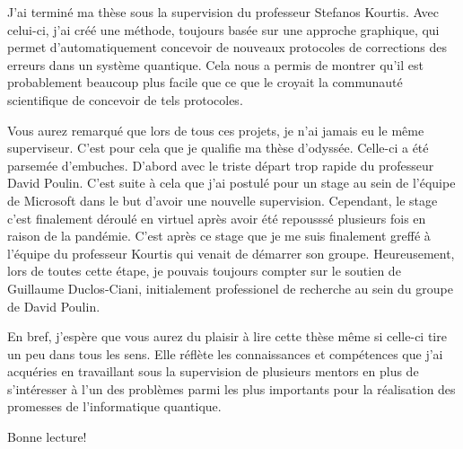 J'ai terminé ma thèse sous la supervision du professeur Stefanos Kourtis.
Avec celui-ci,
j'ai créé une méthode, toujours basée sur une approche graphique, 
qui permet d'automatiquement concevoir de nouveaux protocoles de 
corrections des erreurs dans un système quantique.
Cela nous a permis de montrer qu'il est probablement beaucoup plus facile 
que ce que le croyait la communauté scientifique de concevoir de tels protocoles.

Vous aurez remarqué que lors de tous ces projets,
je n'ai jamais eu le même superviseur.
C'est pour cela que je qualifie ma thèse d'odyssée.
Celle-ci a été parsemée d'embuches.
D'abord avec le triste départ trop rapide du professeur David Poulin.
C'est suite à cela que j'ai postulé pour un stage au sein de l'équipe de Microsoft
dans le but d'avoir une nouvelle supervision.
Cependant, le stage c'est finalement déroulé en virtuel après avoir été repousssé
plusieurs fois en raison de la pandémie.
C'est après ce stage que je me suis finalement greffé à l'équipe du professeur Kourtis 
qui venait de démarrer son groupe.
Heureusement,
lors de toutes cette étape, 
je pouvais toujours compter sur le soutien de Guillaume Duclos-Ciani,
initialement professionel de recherche au sein du groupe de David Poulin.

En bref,
j'espère que vous aurez du plaisir à lire cette thèse même si celle-ci 
tire un peu dans tous les sens.
Elle réflète les connaissances et compétences que j'ai acquéries en travaillant sous 
la supervision de plusieurs mentors en plus de s'intéresser à l'un des problèmes
parmi les plus importants pour la réalisation des promesses de l'informatique quantique.

Bonne lecture!
